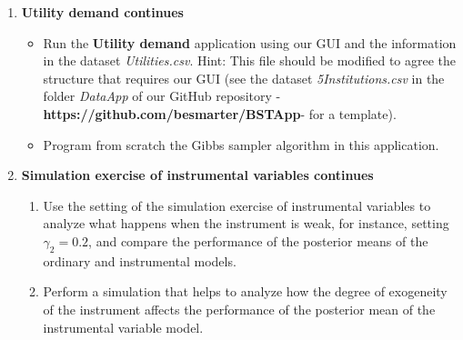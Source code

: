 \begin{enumerate}
\item \textbf{Utility demand continues}

\begin{itemize}
	\item Run the \textbf{Utility demand} application using our GUI and the information in the dataset \textit{Utilities.csv}. Hint: This file should be modified to agree the structure that requires our GUI (see the dataset \textit{5Institutions.csv} in the folder \textit{DataApp} of our GitHub repository -\textbf{https://github.com/besmarter/BSTApp}- for a template).
	\item Program from scratch the Gibbs sampler algorithm in this application.   
\end{itemize}

\item \textbf{Simulation exercise of instrumental variables continues}

\begin{enumerate}
	\item Use the setting of the simulation exercise of instrumental variables to analyze what happens when the instrument is weak, for instance, setting $\gamma_2=0.2$, and compare the performance of the posterior means of the ordinary and instrumental models.
	\item Perform a simulation that helps to analyze how the degree of exogeneity of the instrument affects the performance of the posterior mean of the instrumental variable model.	 
\end{enumerate}


	
\end{enumerate}


